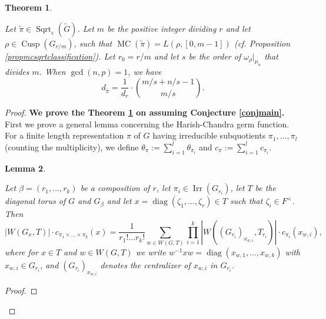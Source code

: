 \documentclass{amsart}
\numberwithin{equation}{section}
\newtheorem{theorem}{\bf{Theorem}}[section]
\newtheorem{lemma}[theorem]{\bf{Lemma}}
\newcommand{\car}[1]{\left|#1\right|}
\newcommand{\rest}{\lvert}
\newcommand{\mrdiag}{\operatorname{diag}}
\newcommand{\mrgcd}{\operatorname{gcd}}
\newcommand{\mrirr}{\operatorname{Irr}}
\newcommand{\mrcusp}{\operatorname{Cusp}}
\newcommand{\mrsqrt}{\operatorname{Sqrt}}
\newcommand{\mrmc}{\operatorname{MC}}
\newcommand{\wt}[1]{\widetilde{#1}}
\begin{document}
	\begin{theorem}\label{thmwhitcal}
		
		Let $\wt{\pi}\in\mrsqrt_{\epsilon}(\wt{G})$. Let $m$ be the positive integer dividing $r$ and let $\rho\in\mrcusp(G_{r/m})$, such that $\mrmc(\wt{\pi})=L(\rho,[0,m-1])$ (\emph{cf.} Proposition \ref{propmcsqrtclassification}). Let $r_{0}=r/m$ and let $s$ be the order of $\omega_{\rho}\rest_{\mu_{n}}$ that divides $m$. When $\mrgcd(n,p)=1$, we have
		$$d_{\wt{\pi}}=\frac{1}{d_{r}}\cdot\binom{m/s+n/s-1}{m/s}.$$ 
		
	\end{theorem}
	
	\begin{proof} 
		
		\textbf{We prove the Theorem \ref{thmwhitcal} on assuming Conjecture \ref{conjmain}.} First we prove a general lemma concerning the Harish-Chandra germ function. For a finite length representation $\pi$ of $G$ having irreducible subquotients $\pi_{1},\dots,\pi_{l}$ (counting the multiplicity), we define $\theta_{\pi}:=\sum_{i=1}^{l}\theta_{\pi_{i}}$ and $c_{\pi}:=\sum_{i=1}^{l}c_{\pi_{i}}$.
		
		\begin{lemma}\label{lemmacBZproduct}
			
			Let $\beta=(r_{1},\dots,r_{k})$ be a composition of $r$, let $\pi_{i}\in\mrirr(G_{r_{i}})$, let $T$ be the diagonal torus of $G$ and $G_{\beta}$ and let $x=\mrdiag(\zeta_{1},\dots,\zeta_{r})\in T$ such that $\zeta_{i}\in F^{\times}$. Then $$\car{W(G_{x},T)}\cdot c_{\pi_{1}\times\dots\times\pi_{k}}(x)=\frac{1}{r_{1}!\dots r_{k}!}\sum_{w\in W(G,T)}\prod_{i=1}^{k}\car{W((G_{r_{i}})_{x_{w,i}},T_{r_{i}})}\cdot c_{\pi_{i}}(x_{w,i}),$$
			where for $x\in T$ and $w\in W(G,T)$ we write $w^{-1}xw=\mrdiag(x_{w,1},\dots, x_{w,k})$ with $x_{w,i}\in G_{r_{i}}$, and $(G_{r_{i}})_{x_{w,i}}$ denotes the centralizer of $x_{w,i}$ in $G_{r_{i}}$.
			
		\end{lemma}
		
		\begin{proof}
			

\end{proof}
\end{proof}
\end{document}
